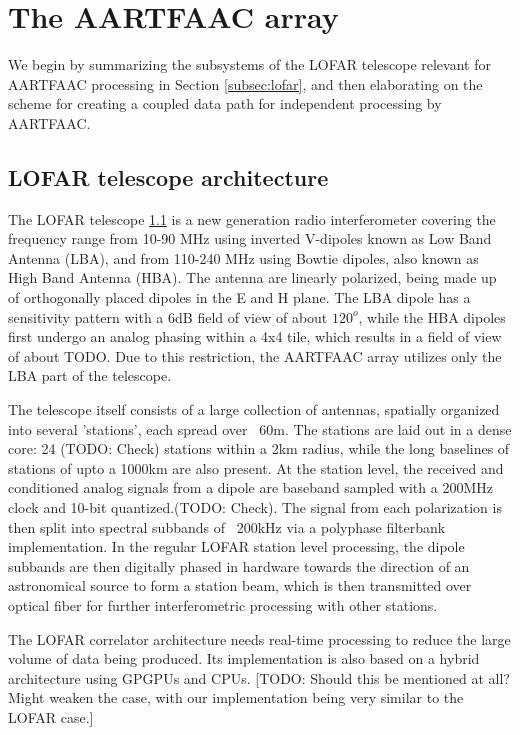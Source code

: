 \documentclass{ws-jai}
\begin{document}
\section {\label{sec:aartfaac_array}The AARTFAAC array}
We  begin by  summarizing the  subsystems of  the LOFAR  telescope relevant  for
AARTFAAC processing in  Section \ref{subsec:lofar}, and then  elaborating on the
scheme for creating a coupled data path for independent processing by AARTFAAC.

\subsection {\label{subsec:lofar} LOFAR telescope architecture}
The LOFAR telescope \ref{} is a new generation radio interferometer covering the
frequency  range from  10-90  MHz using  inverted V-dipoles  known  as Low  Band
Antenna (LBA),  and from 110-240  MHz using Bowtie  dipoles, also known  as High
Band  Antenna (HBA).   The  antenna are  linearly polarized,  being  made up  of
orthogonally  placed  dipoles in  the  E  and H  plane.  The  LBA dipole  has  a
sensitivity pattern  with a 6dB  field of view of  about $120^o$, while  the HBA
dipoles first undergo  an analog phasing within  a 4x4 tile, which  results in a
field  of view  of  about TODO.  Due  to this  restriction,  the AARTFAAC  array
utilizes only the LBA part of the telescope.

The  telescope itself  consists of  a  large collection  of antennas,  spatially
organized into several 'stations', each spread  over ~60m. The stations are laid
out in a  dense core: 24 (TODO:  Check) stations within a 2km  radius, while the
long baselines  of stations of  upto a 1000km are  also present. At  the station
level, the  received and conditioned analog  signals from a dipole  are baseband
sampled with a 200MHz clock and  10-bit quantized.(TODO: Check). The signal from
each  polarization  is then  split  into  spectral  subbands  of ~200kHz  via  a
polyphase  filterbank  implementation.   In  the  regular  LOFAR  station  level
processing, the  dipole subbands are  then digitally phased in  hardware towards
the direction of  an astronomical source to  form a station beam,  which is then
transmitted over optical fiber for further interferometric processing with other
stations.

The LOFAR correlator architecture needs real-time processing to reduce the large
volume of  data being  produced. Its  implementation is also  based on  a hybrid
architecture using  GPGPUs and  CPUs. [TODO:  Should this  be mentioned  at all?
  Might weaken the case, with our implementation being very similar to the LOFAR
  case.]
\end{document}
